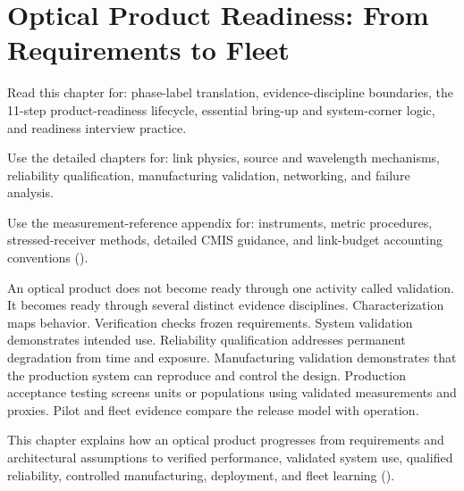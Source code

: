 \chapter{Optical Product Readiness: From Requirements to Fleet}
\label{ch:product-readiness}
\label{ch:validation}

Read this chapter for: phase-label translation, evidence-discipline
boundaries, the 11-step product-readiness lifecycle, essential bring-up and
system-corner logic, and readiness interview practice.

Use the detailed chapters for: link physics, source and wavelength mechanisms,
reliability qualification, manufacturing validation, networking, and failure
analysis.

Use the measurement-reference appendix for: instruments, metric procedures,
stressed-receiver methods, detailed CMIS guidance, and link-budget accounting
conventions
().

An optical product does not become ready through one activity called validation.
It becomes ready through several distinct evidence disciplines.
Characterization maps behavior. Verification checks frozen requirements.
System validation demonstrates intended use. Reliability qualification
addresses permanent degradation from time and exposure. Manufacturing
validation demonstrates that the production system can reproduce and control
the design. Production acceptance testing screens units or populations using
validated measurements and proxies. Pilot and fleet evidence compare the
release model with operation.

This chapter explains how an optical product progresses from requirements and
architectural assumptions to verified performance, validated system use,
qualified reliability, controlled manufacturing, deployment, and fleet
learning
().


